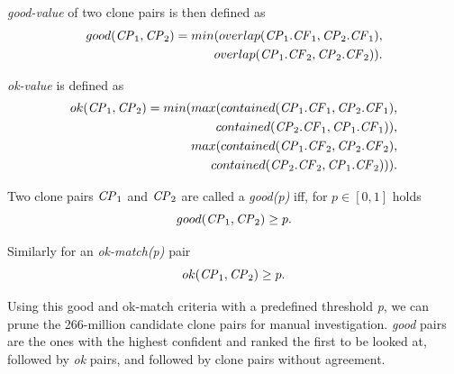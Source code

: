 \documentclass{sig-alternate-05-2015}
\newcommand{\squeezeup}{\vspace{-0.5mm}}
\begin{document}
\noindent\textit{good-value} of two clone pairs is then defined as
\begin{align*}
	good(\textrm{\textit{CP}}_1, \textrm{\textit{CP}}_2) = min(overlap(\textrm{\textit{CP}}_1.\textrm{\textit{CF}}_1,\textrm{\textit{CP}}_2.\textrm{\textit{CF}}_1), \\ overlap(\textrm{\textit{CP}}_1.\textrm{\textit{CF}}_2,\textrm{\textit{CP}}_2.\textrm{\textit{CF}}_2)).
\end{align*}

\noindent\textit{ok-value} is defined as
\begin{align*}
	ok(\textrm{\textit{CP}}_1,\textrm{\textit{CP}}_2) = min(max(contained(\textrm{\textit{CP}}_1.\textrm{\textit{CF}}_1,\textrm{\textit{CP}}_2.\textrm{\textit{CF}}_1), \\ contained(\textrm{\textit{CP}}_2.\textrm{\textit{CF}}_1,\textrm{\textit{CP}}_1.\textrm{\textit{CF}}_1)),
	\\ max(contained(\textrm{\textit{CP}}_1.\textrm{\textit{CF}}_2,\textrm{\textit{CP}}_2.\textrm{\textit{CF}}_2), \\contained(\textrm{\textit{CP}}_2.\textrm{\textit{CF}}_2,\textrm{\textit{CP}}_1.\textrm{\textit{CF}}_2))).
\end{align*}

Two clone pairs $\textrm{\textit{CP}}_1$ and $\textrm{\textit{CP}}_2$ are called a \textit{\textit{good}(p)} iff, for $p \in [0,1]$ holds 
\begin{equation}
good(\textrm{\textit{CP}}_1,\textrm{\textit{CP}}_2) \geq p.
\end{equation}

Similarly for an \textit{ok-match(p)} pair
\begin{equation}
ok(\textrm{\textit{CP}}_1,\textrm{\textit{CP}}_2) \geq p.
\end{equation}

Using this good and ok-match criteria with a predefined threshold \textit{p}, we can prune the 266-million candidate clone pairs for manual investigation. \textit{good} pairs are the ones with the highest confident and ranked the first to be looked at, followed by \textit{ok} pairs, and followed by clone pairs without agreement.
\end{document}
